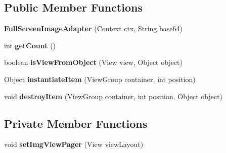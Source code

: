 \subsection*{Public Member Functions}
\begin{DoxyCompactItemize}
\item 
{\bfseries Full\+Screen\+Image\+Adapter} (Context ctx, String base64)\hypertarget{classcom_1_1example_1_1sebastian_1_1tindertp_1_1animationTools_1_1FullScreenImageAdapter_aa6cd6449ea373c8c2047b2e02ca9b80a}{}\label{classcom_1_1example_1_1sebastian_1_1tindertp_1_1animationTools_1_1FullScreenImageAdapter_aa6cd6449ea373c8c2047b2e02ca9b80a}

\item 
int {\bfseries get\+Count} ()\hypertarget{classcom_1_1example_1_1sebastian_1_1tindertp_1_1animationTools_1_1FullScreenImageAdapter_a04a1dc1c283ad2d3d6c77f7dc351d061}{}\label{classcom_1_1example_1_1sebastian_1_1tindertp_1_1animationTools_1_1FullScreenImageAdapter_a04a1dc1c283ad2d3d6c77f7dc351d061}

\item 
boolean {\bfseries is\+View\+From\+Object} (View view, Object object)\hypertarget{classcom_1_1example_1_1sebastian_1_1tindertp_1_1animationTools_1_1FullScreenImageAdapter_a187d0f9df7d3ed5009c280306f32e22f}{}\label{classcom_1_1example_1_1sebastian_1_1tindertp_1_1animationTools_1_1FullScreenImageAdapter_a187d0f9df7d3ed5009c280306f32e22f}

\item 
Object {\bfseries instantiate\+Item} (View\+Group container, int position)\hypertarget{classcom_1_1example_1_1sebastian_1_1tindertp_1_1animationTools_1_1FullScreenImageAdapter_a928053683a38bbf7a604d480b4c8e553}{}\label{classcom_1_1example_1_1sebastian_1_1tindertp_1_1animationTools_1_1FullScreenImageAdapter_a928053683a38bbf7a604d480b4c8e553}

\item 
void {\bfseries destroy\+Item} (View\+Group container, int position, Object object)\hypertarget{classcom_1_1example_1_1sebastian_1_1tindertp_1_1animationTools_1_1FullScreenImageAdapter_ad1736ed3796ba432abe2260e0db76054}{}\label{classcom_1_1example_1_1sebastian_1_1tindertp_1_1animationTools_1_1FullScreenImageAdapter_ad1736ed3796ba432abe2260e0db76054}

\end{DoxyCompactItemize}
\subsection*{Private Member Functions}
\begin{DoxyCompactItemize}
\item 
void {\bfseries set\+Img\+View\+Pager} (View view\+Layout)\hypertarget{classcom_1_1example_1_1sebastian_1_1tindertp_1_1animationTools_1_1FullScreenImageAdapter_ac8fe593e3797c0c0e918f037be0d34b1}{}\label{classcom_1_1example_1_1sebastian_1_1tindertp_1_1animationTools_1_1FullScreenImageAdapter_ac8fe593e3797c0c0e918f037be0d34b1}

\end{DoxyCompactItemize}
